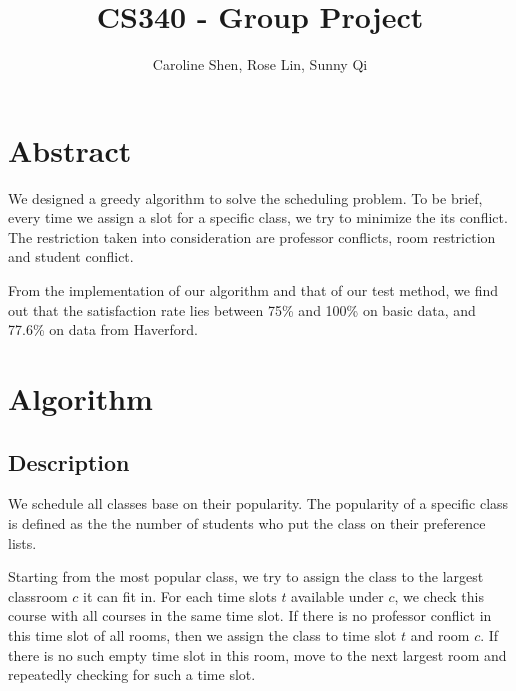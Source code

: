 \documentclass[11pt, oneside]{article}   	%
\title{CS340 - Group Project}
\author{Caroline Shen, Rose Lin, Sunny Qi}
\date{}							%
\begin{document}
\maketitle
\section{Abstract}
We designed a greedy algorithm to solve the scheduling problem. To be brief, every time we assign a slot for a specific class, we try to minimize the its conflict. The restriction taken into consideration are professor conflicts, room restriction and student conflict.

From the implementation of our algorithm and that of our test method, we find out that the satisfaction rate lies between 75\% and 100\% on basic data, and 77.6\% on data from Haverford. 


\section{Algorithm}
\subsection{Description}
We schedule all classes base on their popularity. The popularity of a specific class is defined as the the number of students who put the class on their preference lists.

Starting from the most popular class, we try to assign the class to the largest classroom $c$ it can fit in. For each time slots $t$ available under $c$, we check this course with all courses in the same time slot. 
If there is no professor conflict in this time slot of all rooms, then we assign the class to time slot $t$ and room $c$.
If there is no such empty time slot in this room, move to the next largest room and repeatedly checking for such a time slot. 
\end{document}
